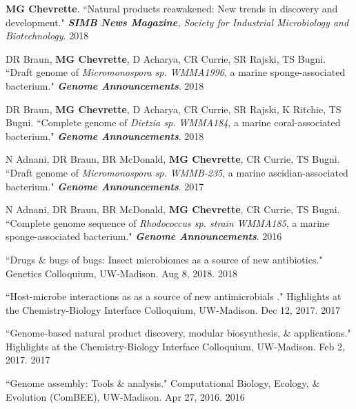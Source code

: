 
\begin{cvpubs}

\cvpub
{\textbf{MG Chevrette}. ``Natural products reawakened: New trends in discovery and development." \textit{\textbf{SIMB News Magazine}, Society for Industrial Microbiology and Biotechnology}. }
{2018}

\cvpub
{DR Braun, \textbf{MG Chevrette}, D Acharya, CR Currie, SR Rajski, TS Bugni. ``Draft genome of \textit{Micromonospora sp. WMMA1996}, a marine sponge-associated bacterium." \textit{\textbf{Genome Announcements}}. \textbf{\textit{}}}
{2018}

\cvpub
{DR Braun, \textbf{MG Chevrette}, D Acharya, CR Currie, SR Rajski, K Ritchie, TS Bugni. ``Complete genome of \textit{Dietzia sp. WMMA184}, a marine coral-associated bacterium." \textit{\textbf{Genome Announcements}}. \textbf{\textit{}}}
{2018}

\cvpub
{N Adnani, DR Braun, BR McDonald, \textbf{MG Chevrette}, CR Currie, TS Bugni. ``Draft genome of \textit{Micromonospora sp. WMMB-235}, a marine ascidian-associated bacterium." \textit{\textbf{Genome Announcements}}. \textbf{\textit{}}}
{2017}

\cvpub
{N Adnani, DR Braun, BR McDonald, \textbf{MG Chevrette}, CR Currie, TS Bugni. ``Complete genome sequence of \textit{Rhodococcus sp. strain WMMA185}, a marine sponge-associated bacterium." \textit{\textbf{Genome Announcements}}. \textbf{\textit{}}}
{2016}

\end{cvpubs}


\begin{cvpubs} 

\cvpub
{``Drugs \& bugs of bugs: Insect microbiomes as a source of new antibiotics." Genetics Colloquium, UW-Madison. Aug 8, 2018.}
{2018}

\cvpub
{``Host-microbe interactions as as a source of new antimicrobials
." Highlights at the Chemistry-Biology Interface Colloquium, UW-Madison. Dec 12, 2017.}
{2017}

\cvpub
{``Genome-based natural product discovery, modular biosynthesis, \& applications." Highlights at the Chemistry-Biology Interface Colloquium, UW-Madison. Feb 2, 2017.}
{2017}

\cvpub
{``Genome assembly: Tools \& analysis." Computational Biology, Ecology, \& Evolution (ComBEE), UW-Madison. Apr 27, 2016.}
{2016}

\end{cvpubs}

